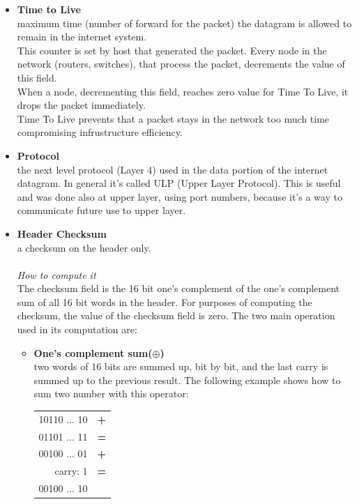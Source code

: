 \begin{itemize}
{The fragment offset is measured in units of 8 octets (64 bits).  The first fragment has offset zero.\\ It's computed starting from initial position in the packet.
}
\item{\textbf{Time to Live}\\
maximum time (number of forward for the packet) the datagram is allowed to remain in the internet system.\\
This counter is set by host that generated the packet. Every node in the network (routers, switches), that process the packet, decrements the value of this field.\\
When a node, decrementing this field, reaches zero value for Time To Live, it drops the packet immediately.\\
Time To Live prevents that a packet stays in the network too much time compromising infrustructure efficiency.
}
\item{\textbf{Protocol}\\
the next level protocol (Layer 4) used in the data portion of the internet datagram. In general it's called ULP (Upper Layer Protocol). This is useful and was done also at upper layer, using port numbers, because it's a way to communicate future use to upper layer.
}
\item{\textbf{Header Checksum}\\
a checksum on the header only.\\\\
\textit{How to compute it}\\
The checksum field is the 16 bit one's complement of the one's complement sum of all 16 bit words in the header.  For purposes of computing the checksum, the value of the checksum field is zero. The two main operation used in its computation are:
\begin{itemize}
\item{\textbf{One's complement sum(}$\oplus$\textbf{)}\\
two words of 16 bits are summed up, bit by bit, and the last carry is summed up to the previous result. The following example shows how to sum two number with this operator:
\begin{table}[h]
\centering\footnotesize
\begin{tabular}{rl}
{10110 ... 10} & {\textbf{+}}\\
{01101 ... 11} & {\textbf{=}}\\
\hline
{00100 ... 01} & {\textbf{+}}\\
{carry: 1} & {\textbf{=}}\\
\hline
{00100 ... 10} &\\
\end{tabular}
\end{table}
}


\end{itemize}}
\end{itemize}
